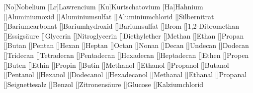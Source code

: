 [No]{Nobelium}%
[Lr]{Lawrencium}%
[Ku]{Kurtschatovium}%
[Ha]{Hahnium}%
[]{Aluminiumoxid}%
[]{Aluminiumsulfat}%
[]{Aluminiumchlorid}%
[]{Silbernitrat}%
[]{Bariumcarbonat}%
[]{Bariumhydroxid}%
[]{Bariumsulfat}%
[]{Brom}%
[]{1,2-Dibromethan}%
[]{Essigsäure}%
[]{Glycerin}%
[]{Nitroglycerin}%
[]{Diethylether}%
[]{Methan}%
[]{Ethan}%
[]{Propan}%
[]{Butan}%
[]{Pentan}%
[]{Hexan}%
[]{Heptan}%
[]{Octan}%
[]{Nonan}%
[]{Decan}%
[]{Undecan}%
[]{Dodecan}%
[]{Tridecan}%
[]{Tetradecan}%
[]{Pentadecan}%
[]{Hexadecan}%
[]{Heptadecan}%
[]{Ethen}%
[]{Propen}%
[]{Buten}%
[]{Ethin}%
[]{Propin}%
[]{Butin}%
[]{Methanol}%
[]{Ethanol}%
[]{Propanol}%
[]{Butanol}%
[]{Pentanol}%
[]{Hexanol}%
[]{Dodecanol}%
[]{Hexadecanol}%
[]{Methanal}%
[]{Ethanal}%
[]{Propanal}%
[]{Seignettesalz}%
[]{Benzol}%
[]{Zitronensäure}%
[]{Glucose}%
[]{Kalziumchlorid}%
